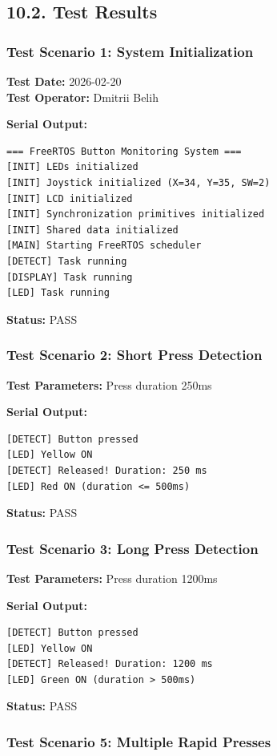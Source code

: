 \documentclass[12pt]{article}
\begin{document}
\subsection*{10.2. Test Results}

\subsubsection*{Test Scenario 1: System Initialization}

\textbf{Test Date:} 2026-02-20 \\
\textbf{Test Operator:} Dmitrii Belih

\textbf{Serial Output:}
\begin{verbatim}
=== FreeRTOS Button Monitoring System ===
[INIT] LEDs initialized
[INIT] Joystick initialized (X=34, Y=35, SW=2)
[INIT] LCD initialized
[INIT] Synchronization primitives initialized
[INIT] Shared data initialized
[MAIN] Starting FreeRTOS scheduler
[DETECT] Task running
[DISPLAY] Task running
[LED] Task running
\end{verbatim}

\textbf{Status:} PASS

\subsubsection*{Test Scenario 2: Short Press Detection}

\textbf{Test Parameters:} Press duration 250ms

\textbf{Serial Output:}
\begin{verbatim}
[DETECT] Button pressed
[LED] Yellow ON
[DETECT] Released! Duration: 250 ms
[LED] Red ON (duration <= 500ms)
\end{verbatim}

\textbf{Status:} PASS

\subsubsection*{Test Scenario 3: Long Press Detection}

\textbf{Test Parameters:} Press duration 1200ms

\textbf{Serial Output:}
\begin{verbatim}
[DETECT] Button pressed
[LED] Yellow ON
[DETECT] Released! Duration: 1200 ms
[LED] Green ON (duration > 500ms)
\end{verbatim}

\textbf{Status:} PASS

\subsubsection*{Test Scenario 5: Multiple Rapid Presses}
\end{document}
